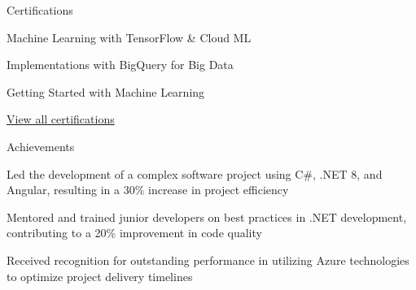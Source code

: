 \documentclass{resume} %
\begin{document}
    \begin{rSection}{Certifications}
        \begin{rSubsection}{}{}{}
                            \item Machine Learning with TensorFlow \& Cloud ML
                            \item Implementations with BigQuery for Big Data
                            \item Getting Started with Machine Learning
                    \end{rSubsection}
        \href{https://skillsoft.digitalbadges.skillsoft.com/profile/umairsaeed185770/wallet}{View all certifications}
    \end{rSection}

    \begin{rSection}{Achievements}
        \begin{rSubsection}{}{}{}
                            \item Led the development of a complex software project using C\#, .NET 8, and Angular, resulting in a 30\% increase in project efficiency
                            \item Mentored and trained junior developers on best practices in .NET development, contributing to a 20\% improvement in code quality
                            \item Received recognition for outstanding performance in utilizing Azure technologies to optimize project delivery timelines
                    \end{rSubsection}
    \end{rSection}
\end{document}
